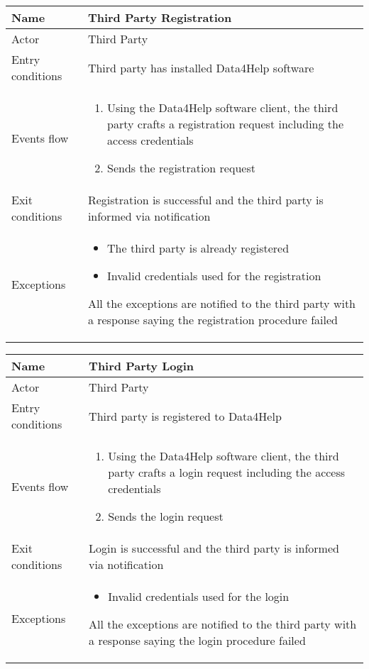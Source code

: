 \begin{table}[h!]
    \begin{tabular}{|l|p{12cm}|}
        \hline
        Name             & Third Party Registration \\ \hline
        Actor            & Third Party \\ \hline
        Entry conditions & Third party has installed Data4Help software \\ \hline
        Events flow      & 
        \begin{enumerate}
            \item Using the Data4Help software client, the third party crafts a registration request including the access credentials
            \item Sends the registration request
        \end{enumerate} \\ \hline
        Exit conditions  & Registration is successful and the third party is informed via notification \\ \hline
        Exceptions       & 
        \begin{itemize}
            \item The third party is already registered
            \item Invalid credentials used for the registration
        \end{itemize} All the exceptions are notified to the third party with a response saying the registration procedure failed \\ \hline
    \end{tabular}
\end{table}

\newpage

\begin{table}[h!]
    \begin{tabular}{|l|p{12cm}|}
        \hline
        Name             & Third Party Login \\ \hline
        Actor            & Third Party \\ \hline
        Entry conditions & Third party is registered to Data4Help \\ \hline
        Events flow      & 
        \begin{enumerate}
            \item Using the Data4Help software client, the third party crafts a login request including the access credentials
            \item Sends the login request
        \end{enumerate} \\ \hline
        Exit conditions  & Login is successful and the third party is informed via notification  \\ \hline
        Exceptions       & 
        \begin{itemize}
            \item Invalid credentials used for the login
        \end{itemize} All the exceptions are notified to the third party with a response saying the login procedure failed \\ \hline
    \end{tabular}
\end{table}

